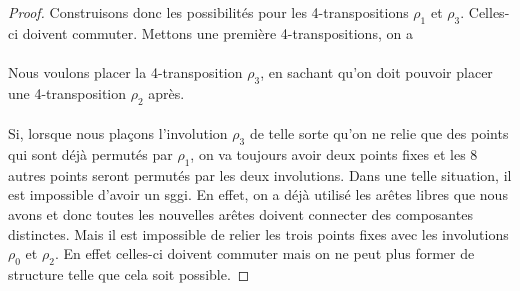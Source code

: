 \begin{proof}
  Construisons donc les possibilités pour les 4-transpositions $\rho_1$ et $\rho_3$. Celles-ci doivent commuter. Mettons une première 4-transpositions, on a
  \begin{figure}[H]
    \begin{center}
      \caption{}
    \end{center}
  \end{figure}

  \paragraph{}
  Nous voulons placer la 4-transposition $\rho_3$, en sachant qu'on doit pouvoir placer une 4-transposition $\rho_2$ après.

  \paragraph{}
  Si, lorsque nous plaçons l'involution $\rho_3$ de telle sorte qu'on ne relie que des points qui sont déjà permutés par $\rho_1$, on va toujours avoir deux points fixes et les 8 autres points seront permutés par les deux involutions. Dans une telle situation, il est impossible d'avoir un sggi. En effet, on a déjà utilisé les arêtes libres que nous avons et donc toutes les nouvelles arêtes doivent connecter des composantes distinctes. Mais il est impossible de relier les trois points fixes avec les involutions $\rho_0$ et $\rho_2$. En effet celles-ci doivent commuter mais on ne peut plus former de structure telle que cela soit possible.


\end{proof}
